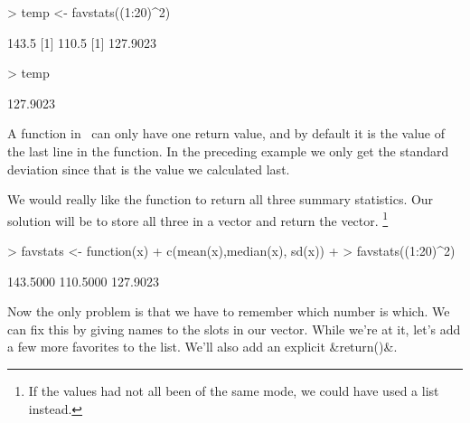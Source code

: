 \begin{Schunk}
\begin{Sinput}
> temp <- favstats((1:20)^2)
\end{Sinput}
\begin{Soutput}
[1] 143.5
[1] 110.5
[1] 127.9023
\end{Soutput}
\begin{Sinput}
> temp
\end{Sinput}
\begin{Soutput}
[1] 127.9023
\end{Soutput}
\end{Schunk}
A function in \R\ can only have one return value, and by default it is the 
value of the last line in the function.  
In the preceding example we only get the standard deviation since 
that is the value we calculated last.

We would really like the function to return all three summary statistics.  
Our solution will be to
store all three in a vector and return the vector.%
\footnote{If the values had not all been of the same mode, we 
could have used a list instead.}

\begin{Schunk}
\begin{Sinput}
> favstats <- function(x) {
+ 	c(mean(x),median(x), sd(x))
+ }
> favstats((1:20)^2)
\end{Sinput}
\begin{Soutput}
[1] 143.5000 110.5000 127.9023
\end{Soutput}
\end{Schunk}
Now the only problem is that we have to remember which number is which.
We can fix this by giving names to the slots in our vector.
While we're at it, let's add a few more favorites to the list.
We'll also add an explicit &return()&.
%

